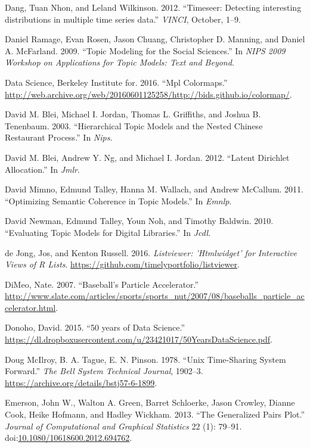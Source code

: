\documentclass[12pt,]{isuthesis}
\begin{document}
\hypertarget{ref-Wilkinson:2012}{}
Dang, Tuan Nhon, and Leland Wilkinson. 2012. ``Timeseer: Detecting
interesting distributions in multiple time series data.'' \emph{VINCI},
October, 1--9.

\hypertarget{ref-Ramage}{}
Daniel Ramage, Evan Rosen, Jason Chuang, Christopher D. Manning, and
Daniel A. McFarland. 2009. ``Topic Modeling for the Social Sciences.''
In \emph{NIPS 2009 Workshop on Applications for Topic Models: Text and
Beyond}.

\hypertarget{ref-viridis}{}
Data Science, Berkeley Institute for. 2016. ``Mpl Colormaps.''
\url{http://web.archive.org/web/20160601125258/http://bids.github.io/colormap/}.

\hypertarget{ref-Blei-hierarchical}{}
David M. Blei, Michael I. Jordan, Thomas L. Griffiths, and Joshua B.
Tenenbaum. 2003. ``Hierarchical Topic Models and the Nested Chinese
Restaurant Process.'' In \emph{Nips}.

\hypertarget{ref-Blei-2003}{}
David M. Blei, Andrew Y. Ng, and Michael I. Jordan. 2012. ``Latent
Dirichlet Allocation.'' In \emph{Jmlr}.

\hypertarget{ref-Mimno}{}
David Mimno, Edmund Talley, Hanna M. Wallach, and Andrew McCallum. 2011.
``Optimizing Semantic Coherence in Topic Models.'' In \emph{Emnlp}.

\hypertarget{ref-Newman-JCDL}{}
David Newman, Edmund Talley, Youn Noh, and Timothy Baldwin. 2010.
``Evaluating Topic Models for Digital Libraries.'' In \emph{Jcdl}.

\hypertarget{ref-listviewer}{}
de Jong, Jos, and Kenton Russell. 2016. \emph{Listviewer: 'Htmlwidget'
for Interactive Views of R Lists}.
\url{https://github.com/timelyportfolio/listviewer}.

\hypertarget{ref-slate}{}
DiMeo, Nate. 2007. ``Baseball's Particle Accelerator.''
\url{http://www.slate.com/articles/sports/sports_nut/2007/08/baseballs_particle_accelerator.html}.

\hypertarget{ref-Donoho:2015tu}{}
Donoho, David. 2015. ``50 years of Data Science.''
\url{https://dl.dropboxusercontent.com/u/23421017/50YearsDataScience.pdf}.

\hypertarget{ref-unix}{}
Doug McIlroy, B. A. Tague, E. N. Pinson. 1978. ``Unix Time-Sharing
System Forward.'' \emph{The Bell System Technical Journal}, 1902--3.
\url{https://archive.org/details/bstj57-6-1899}.

\hypertarget{ref-gpp}{}
Emerson, John W., Walton A. Green, Barret Schloerke, Jason Crowley,
Dianne Cook, Heike Hofmann, and Hadley Wickham. 2013. ``The Generalized
Pairs Plot.'' \emph{Journal of Computational and Graphical Statistics}
22 (1): 79--91.
doi:\href{https://doi.org/10.1080/10618600.2012.694762}{10.1080/10618600.2012.694762}.
\end{document}
